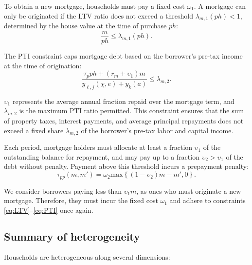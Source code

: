 \documentclass[parskip=full]{article}
\begin{document}
To obtain a new mortgage, households must pay a fixed cost $\omega_{1}$. A mortgage can only be originated if the LTV ratio does not exceed a threshold $\lambda_{m,1}(ph)<1$, determined by the house value at the time of purchase $ph$:
\begin{equation}\label{eq:LTV}
\frac{m}{p h} \leq \lambda_{m,1}(ph).
\end{equation}

\noindent The PTI constraint caps mortgage debt based on the borrower's pre-tax income at the time of origination: 
\begin{equation}\label{eq:PTI}
\frac{\tau_{p}ph+(r_{m}+\upsilon_{1})m}{y_{\ell,j}(\chi,e)+y_{k}(a)} \leq \lambda_{m,2}.
\end{equation}

\noindent $\upsilon_{1}$ represents the average annual fraction repaid over the mortgage term, and $\lambda_{m,2}$ is the maximum PTI ratio permitted. This constraint ensures that the sum of property taxes, interest payments, and average principal repayments does not exceed a fixed share $\lambda_{m,2}$ of the borrower's pre-tax labor and capital income.

Each period, mortgage holders must allocate at least a fraction $\upsilon_{1}$ of the outstanding balance for repayment, and may pay up to a fraction $\upsilon_{2}>\upsilon_{1}$ of the debt without penalty. Payment above this threshold incurs a prepayment penalty:
\begin{equation}\label{eq:prepayment_penalty}
\tau_{pp}(m,m')=\omega_{2}\mbox{max}\left\{(1-\upsilon_{2})m-m',0\right\}.
\end{equation}

\noindent We consider borrowers paying less than $\upsilon_{1}m$, as ones who must originate a new mortgage. Therefore, they must incur the fixed cost $\omega_{1}$ and adhere to constraints \eqref{eq:LTV}--\eqref{eq:PTI} once again.

\subsection{Summary of heterogeneity}

Households are heterogeneous along several dimensions:
\end{document}
